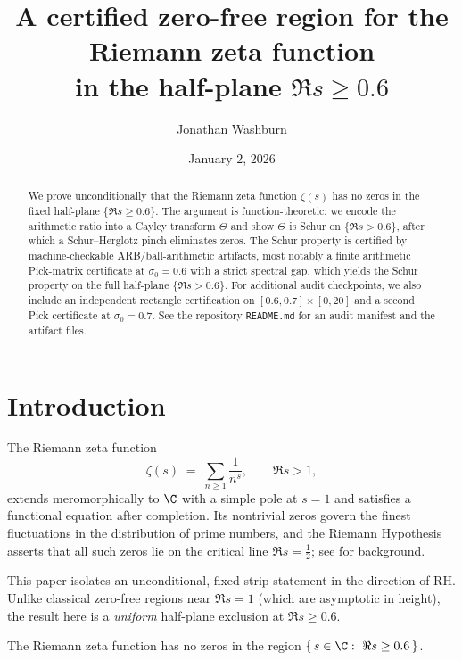 \documentclass[11pt]{article}
\title{A certified zero-free region for the Riemann zeta function\\in the half-plane $\Re s \ge 0.6$}
\author{Jonathan Washburn}
\date{January 2, 2026}
\begin{document}
\maketitle

\begin{abstract}
We prove unconditionally that the Riemann zeta function $\zeta(s)$ has no zeros in the fixed half-plane $\{\Re s \ge 0.6\}$.
The argument is function-theoretic: we encode the arithmetic ratio into a Cayley transform $\Theta$ and show $\Theta$ is Schur on $\{\Re s>0.6\}$, after which a Schur--Herglotz pinch eliminates zeros.
The Schur property is certified by machine-checkable ARB/ball-arithmetic artifacts, most notably a finite arithmetic Pick-matrix certificate at $\sigma_0=0.6$ with a strict spectral gap, which yields the Schur property on the full half-plane $\{\Re s>0.6\}$.
For additional audit checkpoints, we also include an independent rectangle certification on $[0.6,0.7]\times[0,20]$ and a second Pick certificate at $\sigma_0=0.7$.
See the repository \texttt{README.md} for an audit manifest and the artifact files.
\end{abstract}

\section{Introduction}

The Riemann zeta function
\[
  \zeta(s)\;=\;\sum_{n\ge 1}\frac{1}{n^s},\qquad \Re s>1,
\]
extends meromorphically to $\C$ with a simple pole at $s=1$ and satisfies a functional equation after completion.
Its nontrivial zeros govern the finest fluctuations in the distribution of prime numbers, and the Riemann Hypothesis asserts that all such zeros lie on the critical line $\Re s=\tfrac12$; see \cite{Titchmarsh,IK} for background.

This paper isolates an unconditional, fixed-strip statement in the direction of RH.
Unlike classical zero-free regions near $\Re s=1$ (which are asymptotic in height), the result here is a \emph{uniform} half-plane exclusion at $\Re s\ge 0.6$.

\begin{theorem}\label{thm:farfield}
The Riemann zeta function has no zeros in the region $\{\,s\in\C:\ \Re s\ge 0.6\,\}$.
\end{theorem}
\end{document}
